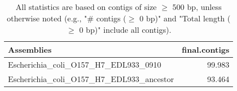 \documentclass[12pt,a4paper]{article}
\begin{document}
\begin{table}[ht]
\begin{center}
\caption{All statistics are based on contigs of size $\geq$ 500 bp, unless otherwise noted (e.g., "\# contigs ($\geq$ 0 bp)" and "Total length ($\geq$ 0 bp)" include all contigs).}
\begin{tabular}{|l*{1}{|r}|}
\hline
Assemblies & final.contigs \\ \hline
Escherichia\_coli\_O157\_H7\_EDL933\_0910 & 99.983 \\ \hline
Escherichia\_coli\_O157\_H7\_EDL933\_ancestor & 93.464 \\ \hline
\end{tabular}
\end{center}
\end{table}
\end{document}
